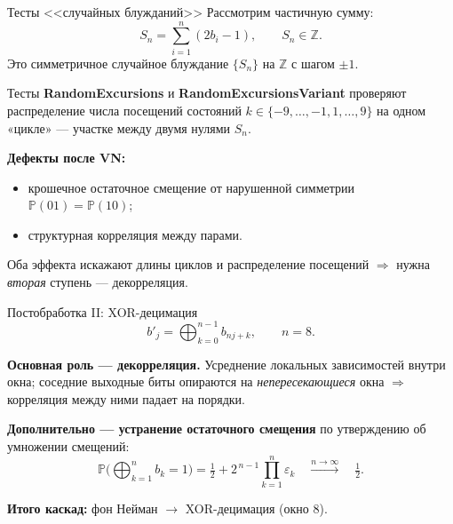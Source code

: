 \documentclass[14pt,aspectratio=169]{beamer}
\begin{document}
\begin{frame}{Тесты <<случайных блужданий>>}
  \footnotesize
  Рассмотрим частичную сумму:
  \[
    S_n=\sum_{i=1}^{n}(2b_i-1),\qquad S_n\in\mathbb{Z}.
  \]
  Это симметричное случайное блуждание $\{S_n\}$ на $\mathbb{Z}$ с шагом $\pm 1$.
  \par\vspace{0.3em}
  Тесты \textbf{RandomExcursions} и \textbf{RandomExcursionsVariant} проверяют распределение числа посещений состояний $k\in\{-9,\ldots,-1,1,\ldots,9\}$ на одном «цикле» --- участке между двумя нулями $S_n$.
  \par\vspace{0.4em}
  \textbf{Дефекты после VN:}
  \begin{itemize}\setlength{\itemsep}{0.1em}
    \item крошечное остаточное смещение от нарушенной симметрии $\mathbb{P}(01)\!=\!\mathbb{P}(10)$;
    \item структурная корреляция между парами.
  \end{itemize}
  Оба эффекта искажают длины циклов и распределение посещений $\Rightarrow$ нужна \emph{вторая} ступень --- декорреляция.
\end{frame}

\begin{frame}{Постобработка II: XOR-децимация}
  \footnotesize
  \[
    b'_j = \bigoplus_{k=0}^{n-1} b_{nj+k}, \qquad n=8.
  \]

  \textbf{Основная роль --- декорреляция.} Усреднение локальных зависимостей внутри окна; соседние выходные биты опираются на \emph{непересекающиеся} окна $\Rightarrow$ корреляция между ними падает на порядки.

  \textbf{Дополнительно --- устранение остаточного смещения} по утверждению об умножении смещений:
  \[
    \mathbb{P}\!\Big(\bigoplus_{k=1}^{n} b_k = 1\Big)
    = \tfrac12 + 2^{\,n-1}\prod_{k=1}^{n}\varepsilon_k
    \quad \xrightarrow{n\to\infty} \quad \tfrac12.
  \]

  \textbf{Итого каскад:} фон Нейман $\to$ XOR-децимация (окно 8).
\end{frame}
\end{document}
